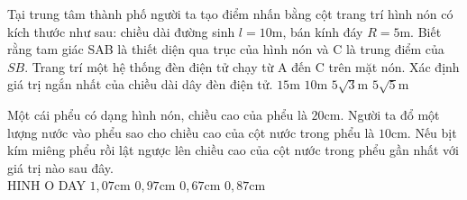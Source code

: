 \begin{ex}
	Tại trung tâm thành phố người ta tạo điểm nhấn bằng cột trang trí hình nón có kích thước như sau: chiều dài đường sinh $l=10 \mathrm{m}$, bán kính đáy $R=5 \mathrm{m}$. Biết rằng tam giác SAB là thiết diện qua trục của hình nón và C là trung điểm của $SB$. Trang trí một hệ thống đèn điện tử chạy từ A đến C trên mặt nón. Xác định giá trị ngắn nhất của chiều dài dây đèn điện tử. 
	\choice
	{$15 \mathrm{m}$}
	{$10 \mathrm{m}$}
	{$5\sqrt{3} \mathrm{m}$}
	{\True $5\sqrt{5} \mathrm{m}$}
\end{ex}
\begin{ex}
	Một cái phểu có dạng hình nón, chiều cao của phểu là $20\mathrm{cm}$. Người ta đổ một lượng nước vào phểu sao cho chiều cao của cột nước trong phểu là $10\mathrm{cm}$. Nếu bịt kím miêng phểu rồi lật ngược lên chiều cao của cột nước trong phểu gần nhất với giá trị nào sau đây. \\
	{\color{red} HINH O DAY}
	\choice
	{$1,07\mathrm{cm}$}
	{$0,97\mathrm{cm}$}
	{$0,67\mathrm{cm}$}
	{\True $0,87\mathrm{cm}$}
\end{ex}
